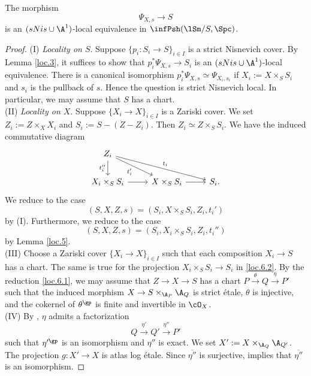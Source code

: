 \documentclass[10pt]{amsart}
\begin{document}
\begin{lem}
\label{loc.6}
The morphism
\[
\Psi_{X,s}\to S
\]
is an $(sNis\cup \A^1)$-local equivalence in $\infPsh(\lSm/S,\Spc)$.
\end{lem}
\begin{proof}
(I) \emph{Locality on $S$}.
Suppose $\{p_i\colon S_i\to S\}_{i\in I}$ is a strict Nisnevich cover.
By Lemma \ref{loc.3}, it suffices to show that $p_i^*\Psi_{X,s}\to S_i$ is an $(sNis\cup \A^1)$-local equivalence.
There is a canonical isomorphism $p_i^*\Psi_{X,s}\simeq \Psi_{X_i,s_i}$ if $X_i:=X\times_S S_i$ and $s_i$ is the pullback of $s$.
Hence the question is strict Nisnevich local.
In particular, we may assume that $S$ has a chart.
\\[5pt]
(II) \emph{Locality on $X$}.
Suppose $\{X_i\to X\}_{i\in I}$ is a Zariski cover.
We set $Z_i:=Z\times_X X_i$ and $S_i:=S-(Z-Z_i)$.
Then $Z_i\simeq Z\times_S S_i$.
We have the induced commutative diagram
\begin{equation}
\label{loc.6.2}
\begin{tikzcd}
Z_i\ar[d,"t_i''"']\ar[rd,"t_i'"']\ar[rrd,"t_i"]
\\
X_i\times_S S_i\ar[r]&
X\times_S S_i\ar[r]&
S_i.
\end{tikzcd}
\end{equation}
We reduce to the case
\[
(S,X,Z,s)=(S_i,X\times_S S_i,Z_i,t_i')
\]
by (I).
Furthermore, we reduce to the case
\begin{equation}
\label{loc.6.1}
(S,X,Z,s)=(S_i,X_i\times_S S_i,Z_i,t_i'')
\end{equation}
by Lemma \ref{loc.5}.
\\[5pt]
(III) Choose a Zariski cover $\{X_i\to X\}_{i\in I}$ such that each composition $X_i\to S$ has a chart.
The same is true for the projection $X_i\times_S S_i\to S_i$ in \eqref{loc.6.2}.
By the reduction \eqref{loc.6.1}, we may assume that $Z\to X\to S$ has a chart $P\xrightarrow{\theta} Q\xrightarrow{\eta} P'$ such that the induced morphism $X\to S\times_{\A_P} \A_Q$ is strict \'etale, $\theta$ is injective, and the cokernel of $\theta^{\gp}$ is finite and invertible in $\cO_X$.
\\[5pt]
(IV)
By \cite[Proposition I.4.2.17]{Ogu}, $\eta$ admits a factorization
\[
Q\xrightarrow{\eta'} Q'\xrightarrow{\eta''} P'
\]
such that $\eta'^\gp$ is an isomorphism and $\eta''$ is exact.
We set $X':=X\times_{\A_Q}\A_{Q'}$.
The projection $g\colon X'\to X$ is atlas log \'etale.
Since $\overline{\eta''}$ is surjective, \cite[Proposition I.4.2.1(3),(5)]{Ogu} implies that $\overline{\eta''}$ is an isomorphism.

\end{proof}
\end{document}
